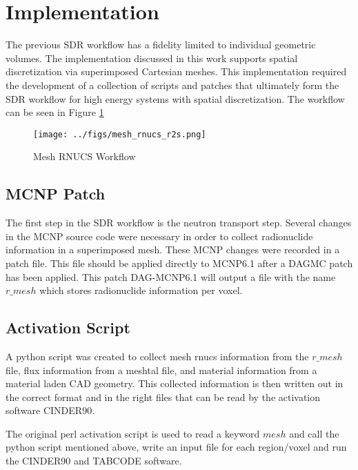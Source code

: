 \section{Implementation}
The previous SDR workflow has a fidelity limited to individual
geometric volumes. The implementation discussed in this work
supports spatial discretization via superimposed Cartesian meshes. 
This implementation required the 
development of a collection of scripts and patches that 
ultimately form the SDR workflow for high energy systems 
with spatial discretization. The workflow can be seen in Figure
\ref{mesh_rnucs}

\begin{figure}[ht]
\begin{centering}
\texttt{[image: ../figs/mesh\_rnucs\_r2s.png]}
\caption{Mesh RNUCS Workflow}
\label{mesh_rnucs}
\end{centering}
\end{figure}


\subsection{MCNP Patch}
The first step in the SDR  workflow is the neutron transport step.
Several changes in the MCNP source code were necessary in order to 
collect radionuclide information in a superimposed mesh.
These MCNP changes were recorded in a patch file. This file should be applied 
directly to MCNP6.1 after a DAGMC patch has been applied.
This patch DAG-MCNP6.1 will output a file with the name $r\_mesh$ which stores 
radionuclide information per voxel. 

\subsection{Activation Script}
A python script was created to collect mesh rnucs information from the $r\_mesh$
file, flux information from a meshtal file, and material information from a 
material laden CAD geometry. This collected information is then written out 
in the correct format and in the right files that can be read by the activation 
software CINDER90. 

The original perl activation script is used to read a keyword $mesh$ and call the 
python script mentioned above, write an input file for each region/voxel and run 
the CINDER90 and TABCODE software. 

\newpage
